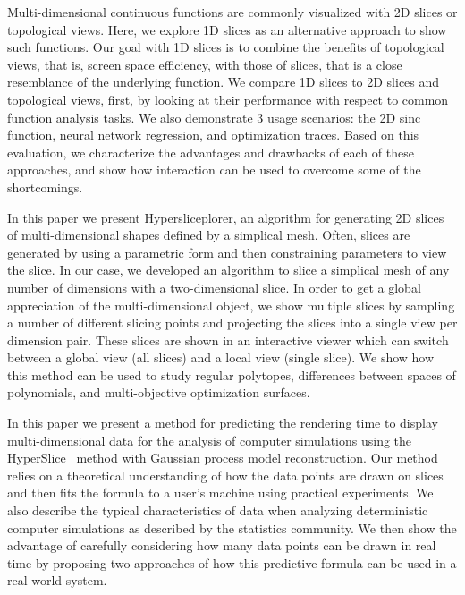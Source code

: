 



Multi-dimensional continuous functions are commonly visualized with 2D slices
or topological views. Here, we explore 1D slices as an alternative approach to
show such functions. Our goal with 1D slices is to combine the benefits of
topological views, that is, screen space efficiency, with those of slices, that
is a close resemblance of the underlying function.  We compare 1D slices to 2D
slices and topological views, first, by looking at their performance with
respect to common function analysis tasks. We also demonstrate 3 usage
scenarios: the 2D sinc function, neural network regression, and optimization
traces. Based on this evaluation, we characterize the advantages and drawbacks
of each of these approaches, and show how interaction can be used to overcome
some of the shortcomings. 


In this paper we present Hypersliceplorer, an algorithm for generating 2D
slices of multi-dimensional shapes defined by a simplical mesh.  Often, slices
are generated by using a parametric form and then constraining parameters to
view the slice. In our case, we developed an algorithm to slice a simplical
mesh of any number of dimensions with a two-dimensional slice.  In order to get
a global appreciation of the multi-dimensional object, we show multiple slices
by sampling a number of different slicing points and projecting the slices into
a single view per dimension pair. These slices are shown in an interactive
viewer which can switch between a global view (all slices) and a local view
(single slice). We show how this method can be used to study regular polytopes,
differences between spaces of polynomials, and multi-objective optimization
surfaces. 


In this paper we present a method for predicting the rendering time to display
multi-dimensional data for the analysis of computer simulations using the
HyperSlice~\cite{Wijk:1993} method with Gaussian process model reconstruction.
Our method relies on a theoretical understanding of how the data points are
drawn on slices and then fits the formula to a user's machine using practical
experiments.  We also describe the typical characteristics of data when
analyzing deterministic computer simulations as described by the statistics
community.  We then show the advantage of carefully considering how many data
points can be drawn in real time by proposing two approaches of how this
predictive formula can be used in a real-world system.

